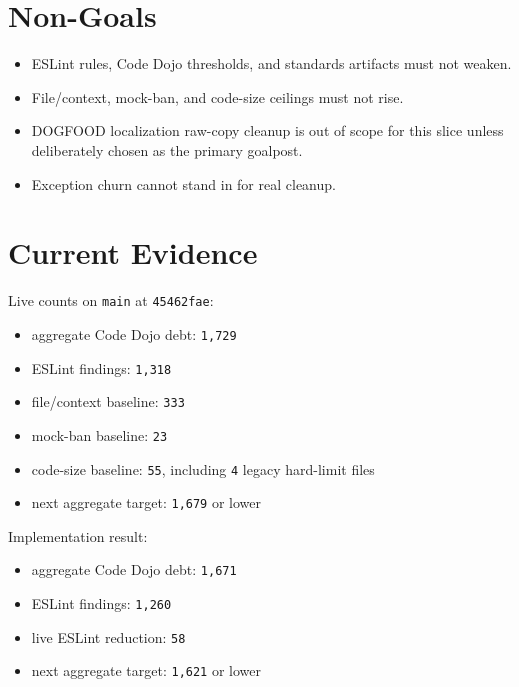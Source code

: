 \section{Non-Goals}\label{record-223-non-goals}

\begin{itemize}
\tightlist
\item
  ESLint rules, Code Dojo thresholds, and standards artifacts must not weaken.
\item
  File/context, mock-ban, and code-size ceilings must not rise.
\item
  DOGFOOD localization raw-copy cleanup is out of scope for this slice unless deliberately chosen as the primary goalpost.
\item
  Exception churn cannot stand in for real cleanup.
\end{itemize}

\section{Current Evidence}\label{record-223-current-evidence}

Live counts on \texttt{m\allowbreak{}a\allowbreak{}i\allowbreak{}n} at \texttt{4\allowbreak{}5\allowbreak{}4\allowbreak{}6\allowbreak{}2\allowbreak{}f\allowbreak{}a\allowbreak{}e}:

\begin{itemize}
\tightlist
\item
  aggregate Code Dojo debt: \texttt{1\allowbreak{},\allowbreak{}7\allowbreak{}2\allowbreak{}9}
\item
  ESLint findings: \texttt{1\allowbreak{},\allowbreak{}3\allowbreak{}1\allowbreak{}8}
\item
  file/context baseline: \texttt{3\allowbreak{}3\allowbreak{}3}
\item
  mock-ban baseline: \texttt{2\allowbreak{}3}
\item
  code-size baseline: \texttt{5\allowbreak{}5}, including \texttt{4} legacy hard-limit files
\item
  next aggregate target: \texttt{1\allowbreak{},\allowbreak{}6\allowbreak{}7\allowbreak{}9} or lower
\end{itemize}

Implementation result:

\begin{itemize}
\tightlist
\item
  aggregate Code Dojo debt: \texttt{1\allowbreak{},\allowbreak{}6\allowbreak{}7\allowbreak{}1}
\item
  ESLint findings: \texttt{1\allowbreak{},\allowbreak{}2\allowbreak{}6\allowbreak{}0}
\item
  live ESLint reduction: \texttt{5\allowbreak{}8}
\item
  next aggregate target: \texttt{1\allowbreak{},\allowbreak{}6\allowbreak{}2\allowbreak{}1} or lower
\end{itemize}

